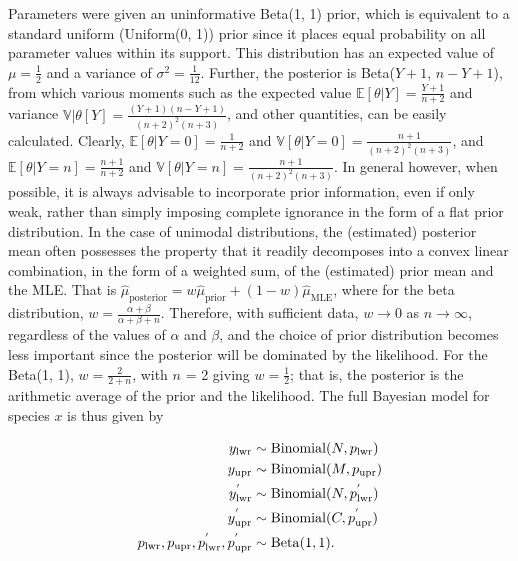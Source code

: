 \documentclass[12pt]{article}
\begin{document}
Parameters were given an uninformative Beta(1, 1) prior, which is equivalent to a standard uniform (Uniform(0, 1)) prior since it places equal probability on all parameter values within its support. This distribution has an expected value of $\mu = \frac{1}{2}$ and a variance of $\sigma^2 = \frac{1}{12}$. Further, the posterior is Beta($Y + 1$, $n - Y + 1$), from which various moments such as the expected value $\mathbb{E}[\theta|Y] = \frac{Y + 1}{n + 2}$ and variance $\mathbb{V|\theta}[Y] = \frac{(Y + 1)(n - Y + 1)}{(n + 2)^2(n + 3)}$, and other quantities, can be easily calculated. Clearly, $\mathbb{E}[\theta|Y = 0] = \frac{1}{n + 2}$ and $\mathbb{V}[\theta|Y = 0] = \frac{n + 1}{(n + 2)^2(n + 3)}$, and \\ $\mathbb{E}[\theta|Y = n] = \frac{n + 1}{n + 2}$ and $\mathbb{V}[\theta|Y = n] = \frac{n + 1}{(n + 2)^2(n + 3)}$. In general however, when possible, it is always advisable to incorporate prior information, even if only weak, rather than simply imposing complete ignorance in the form of a flat prior distribution. In the case of unimodal distributions, the (estimated) posterior mean often possesses the property that it readily decomposes into a convex linear combination, in the form of a weighted sum, of the (estimated) prior mean and the MLE. That is $\hat{\mu}_\mathrm{posterior} = w\hat{\mu}_\mathrm{prior} + (1-w)\hat{\mu}_\mathrm{MLE}$, where for the beta distribution, $w = \frac{\alpha + \beta}{\alpha + \beta + n}$. Therefore, with sufficient data, $w \rightarrow 0$ as $n \rightarrow \infty$, regardless of the values of $\alpha$ and $\beta$, and the choice of prior distribution becomes less important since the posterior will be dominated by the likelihood. For the Beta(1, 1), $w = \frac{2}{2 + n}$, with $n$ = 2 giving $w = \frac{1}{2}$; that is, the posterior is the arithmetic average of the prior and the likelihood. The full Bayesian model for species $x$ is thus given by

\begin{align}
\notag y_\mathrm{lwr} &\sim \mathrm{Binomial}(N, p_\mathrm{lwr}) \\ 
\notag y_\mathrm{upr} &\sim \mathrm{Binomial}(M, p_\mathrm{upr}) \\ 
y^{'}_\mathrm{lwr} &\sim \mathrm{Binomial}(N, p^{'}_\mathrm{lwr}) \\ 
 \notag y^{'}_\mathrm{upr} &\sim \mathrm{Binomial}(C, p^{'}_\mathrm{upr}) \\ 
\notag p_\mathrm{lwr}, p_\mathrm{upr}, p^{'}_\mathrm{lwr}, p^{'}_\mathrm{upr}
&\sim \mathrm{Beta}(1, 1).
\end{align}
\end{document}
